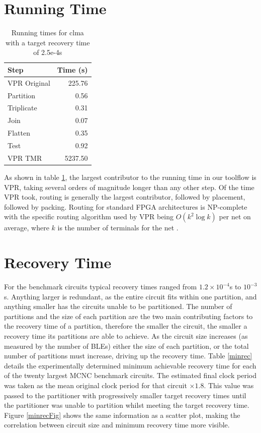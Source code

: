 \documentclass[12pt,final,oneside,a4paper]{dwThesis} %
\begin{document}
   \section{Running Time}\label{timing}
   
   \begin{table}
      \begin{center}
   \begin{tabular}{lr}
	\toprule
   	Step & Time (s) \\
   	\midrule
   	VPR Original & 225.76\\
   	Partition & 0.56 \\
   	Triplicate & 0.31 \\
   	Join & 0.07 \\
   	Flatten & 0.35 \\
   	Test & 0.92 \\
   	VPR TMR & 5237.50\\
   	\bottomrule
   \end{tabular}
   \caption{Running times for clma with a target recovery time of 2.5e-4s}\label{runningtimes}
   \end{center}\end{table}
   As shown in table \ref{runningtimes}, the largest contributor to the running time in our toolflow is \gls{VPR}, taking several orders of magnitude longer than any other step. Of the time \gls{VPR} took, routing is generally the largest contributor, followed by placement, followed by packing.
   Routing for standard \gls{FPGA} architectures is NP-complete \cite{npcomplete} with the specific routing algorithm used by \gls{VPR} being $O(k^2\log{k})$ per net on average,
   where $k$ is the number of terminals for the net \cite{VPRBook}.
   


   \section{Recovery Time}
    For the benchmark circuits typical recovery times ranged from $1.2\times10^{-4}$s to $10^{-3}$s. Anything larger is redundant, as the entire circuit fits within one partition, and anything smaller has the circuits unable to be partitioned. The number of partitions and the size of each partition are the two main contributing factors to the recovery time of a partition, therefore the smaller the circuit, the smaller a recovery time its partitions are able to achieve. As the circuit size increases (as measured by the number of \glspl{BLE}) either the size of each partition, or the total number of partitions must increase, driving up the recovery time.
    Table \ref{minrec} details the experimentally determined minimum achievable recovery time for each of the twenty largest \gls{MCNC} benchmark circuits. The estimated final clock period was taken as the mean original clock period for that circuit $\times 1.8$. This value was passed to the partitioner with progressively smaller target recovery times until the partitioner was unable to partition whilst meeting the target recovery time.
    Figure \ref{minrecFig} shows the same information as a scatter plot, making the correlation between circuit size and minimum recovery time more visible.
    
\end{document}
